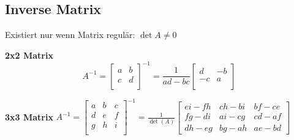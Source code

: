 	
\subsection{Inverse Matrix}
Existiert nur wenn Matrix regulär: $\det A \neq 0$\newline
\begin{minipage}{9cm}
	\textbf{2x2 Matrix}
	$$ A^{-1} = \begin{bmatrix} a & b \\ c & d \\ \end{bmatrix}^{-1} = \frac{1}{ad
	- bc} \begin{bmatrix} d & -b \\ -c & a \\ \end{bmatrix} $$
\end{minipage}
\begin{minipage}{11cm}
	\textbf{3x3 Matrix}\newline
  $  A^{-1} = \begin{bmatrix} a & b & c\\ d & e & f \\ g & h & i \\ \end{bmatrix}^{-1} =
  \frac{1}{\det(A)} \begin{bmatrix} ei - fh & ch - bi & bf - ce \\ fg - di & ai
  - cg & cd - af \\ dh - eg & bg - ah & ae - bd \end{bmatrix} $
\end{minipage}\\

